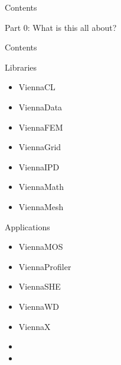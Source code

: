

\begin{frame}{Contents}
  \begin{center}
   \Large Part 0: What is this all about?
  \end{center}
\end{frame}


\begin{frame}{Contents}

 \begin{minipage}{0.5\textwidth}
  \begin{block}{Libraries}
   \begin{itemize}
    \item ViennaCL
    \item ViennaData
    \item ViennaFEM
    \item ViennaGrid
    \item ViennaIPD
    \item ViennaMath
    \item ViennaMesh
   \end{itemize}
  \end{block}
 \end{minipage}
%
 \begin{minipage}{0.45\textwidth}
  \begin{block}{Applications}
   \begin{itemize}
    \item ViennaMOS
    \item ViennaProfiler
    \item ViennaSHE
    \item ViennaWD
    \item ViennaX
    \item
    \item 
   \end{itemize}
  \end{block}
 \end{minipage}
 

\end{frame}




